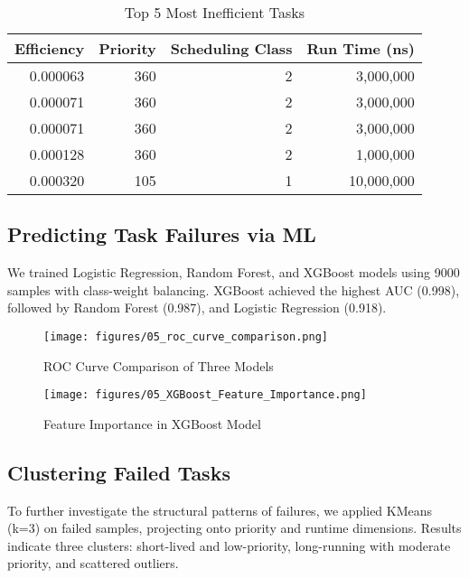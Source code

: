 \documentclass[a4paper,12pt]{article}
\begin{document}
\begin{table}[h]
  \centering
  \caption{Top 5 Most Inefficient Tasks}
  \label{tab:top-ineff}
  \begin{tabular}{rrrr}
  \toprule
  Efficiency & Priority & Scheduling Class & Run Time (ns) \\
  \midrule
  0.000063 & 360 & 2 & 3{,}000{,}000 \\
  0.000071 & 360 & 2 & 3{,}000{,}000 \\
  0.000071 & 360 & 2 & 3{,}000{,}000 \\
  0.000128 & 360 & 2 & 1{,}000{,}000 \\
  0.000320 & 105 & 1 & 10{,}000{,}000 \\
  \bottomrule
  \end{tabular}
\end{table}

\subsection{Predicting Task Failures via ML}

We trained Logistic Regression, Random Forest, and XGBoost models using 9000 samples with class-weight balancing. XGBoost achieved the highest AUC (0.998), followed by Random Forest (0.987), and Logistic Regression (0.918).

\begin{figure}[h]
  \centering
  \texttt{[image: figures/05\_roc\_curve\_comparison.png]}
  \caption{ROC Curve Comparison of Three Models}
  \label{fig:roc-comparison}
\end{figure}

\begin{figure}[h]
  \centering
  \texttt{[image: figures/05\_XGBoost\_Feature\_Importance.png]}
  \caption{Feature Importance in XGBoost Model}
  \label{fig:feature-importance}
\end{figure}

\subsection{Clustering Failed Tasks}

To further investigate the structural patterns of failures, we applied KMeans (k=3) on failed samples, projecting onto priority and runtime dimensions. Results indicate three clusters: short-lived and low-priority, long-running with moderate priority, and scattered outliers.
\end{document}
